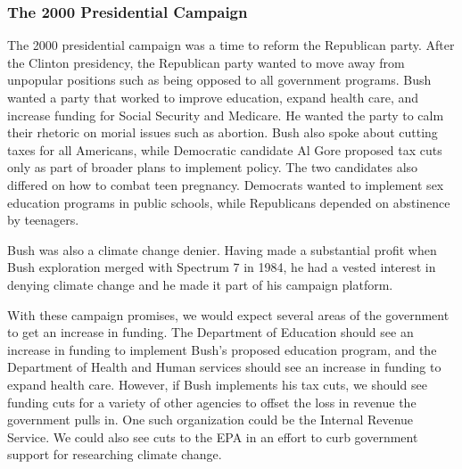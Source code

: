 \documentclass{article}
\begin{document}
        \subsubsection{The 2000 Presidential Campaign}
        The 2000 presidential campaign was a time to reform the Republican party. After the Clinton presidency, the Republican party wanted to move away from unpopular positions such as being opposed to all government programs. Bush wanted a party that worked to improve education, expand health care, and increase funding for Social Security and Medicare. He wanted the party to calm their rhetoric on morial issues such as abortion. Bush also spoke about cutting taxes for all Americans, while Democratic candidate Al Gore proposed tax cuts only as part of broader plans to implement policy. The two candidates also differed on how to combat teen pregnancy. Democrats wanted to implement sex education programs in public schools, while Republicans depended on abstinence by teenagers.\cite{bushcampaign2000}
        \par
        Bush was also a climate change denier. Having made a substantial profit when Bush exploration merged with Spectrum 7 in 1984, he had a vested interest in denying climate change and he made it part of his campaign platform.\cite{bushhistory}
        \par
        With these campaign promises, we would expect several areas of the government to get an increase in funding. The Department of Education should see an increase in funding to implement Bush's proposed education program, and the Department of Health and Human services should see an increase in funding to expand health care. However, if Bush implements his tax cuts, we should see funding cuts for a variety of other agencies to offset the loss in revenue the government pulls in. One such organization could be the Internal Revenue Service. We could also see cuts to the EPA in an effort to curb government support for researching climate change.
\end{document}
